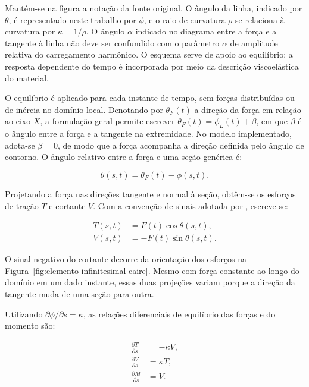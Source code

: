 \documentclass[arial,centeredequations,english,brazilian,oneside,section=TITLE]{ifes8}
\begin{document}
Mantém-se na figura a notação da fonte original. O ângulo da linha, indicado por
$\theta$, é representado neste trabalho por $\phi$, e o raio de curvatura $\rho$
se relaciona à curvatura por $\kappa=1/\rho$. O ângulo $\alpha$ indicado no diagrama
entre a força e a tangente à linha não deve ser confundido com o parâmetro $\alpha$
de amplitude relativa do carregamento harmônico. O esquema serve de apoio ao equilíbrio;
a resposta dependente do tempo é incorporada por meio da descrição viscoelástica
do material.

O equilíbrio é aplicado para cada instante de tempo, sem forças distribuídas ou
de inércia no domínio local. Denotando por $\theta_F(t)$ a direção da força em
relação ao eixo $X$, a formulação geral permite escrever
$\theta_F(t)=\phi_L(t)+\beta$, em que $\beta$ é o ângulo entre a força e a tangente
na extremidade. No modelo implementado, adota-se $\beta=0$, de modo que a força
acompanha a direção definida pelo ângulo de contorno. O ângulo relativo entre a
força e uma seção genérica é:

\begin{equation}
  \theta(s,t)=\theta_F(t)-\phi(s,t).
  \label{eq:angulo-relativo-equilibrio}
\end{equation}

Projetando a força nas direções tangente e normal à seção, obtêm-se os esforços
de tração $T$ e cortante $V$. Com a convenção de sinais adotada por
, escreve-se:

\begin{align}
  T(s,t)&=F(t)\cos\theta(s,t),
    \label{eq:tracao-equilibrio}\\
  V(s,t)&=-F(t)\sin\theta(s,t).
    \label{eq:cortante-equilibrio}
\end{align}

O sinal negativo do cortante decorre da orientação dos esforços na
Figura~\ref{fig:elemento-infinitesimal-caire}. Mesmo com força constante ao longo
do domínio em um dado instante, essas duas projeções variam porque a direção
da tangente muda de uma seção para outra.

Utilizando $\partial\phi/\partial s=\kappa$, as relações diferenciais de
equilíbrio das forças e do momento são:

\begin{align}
  \frac{\partial T}{\partial s}&=-\kappa V,
    \label{eq:equilibrio-diferencial-tracao}\\
  \frac{\partial V}{\partial s}&=\kappa T,
    \label{eq:equilibrio-diferencial-cortante}\\
  \frac{\partial M}{\partial s}&=V.
    \label{eq:equilibrio-diferencial-momento}
\end{align}
\end{document}
